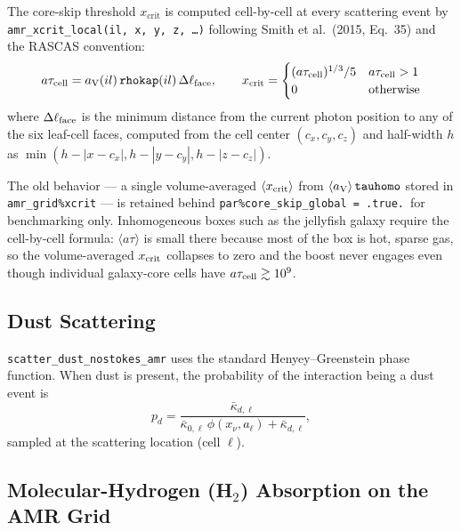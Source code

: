 \documentclass[english,a4paper]{my_memo}
\begin{document}
The core-skip threshold $x_\mathrm{crit}$ is computed cell-by-cell at every
scattering event by \texttt{amr\_xcrit\_local(il, x, y, z, \dots)}
following Smith et al.\ (2015, Eq.~35) and the RASCAS convention:
\[
   a\tau_{\rm cell} = a_{\rm V}(il)\,\mathtt{rhokap}(il)\,
                      \Delta\ell_{\rm face},
   \qquad
   x_{\rm crit} =
   \begin{cases}
     (a\tau_{\rm cell})^{1/3}/5 & a\tau_{\rm cell} > 1 \\
     0 & \text{otherwise}
   \end{cases}
\]
where $\Delta\ell_{\rm face}$ is the minimum distance from the current
photon position to any of the six leaf-cell faces, computed from the cell
center $(c_x, c_y, c_z)$ and half-width $h$ as $\min(h-|x-c_x|, h-|y-c_y|,
h-|z-c_z|)$.

The old behavior --- a single volume-averaged
$\langle x_{\rm crit}\rangle$ from
$\langle a_{\rm V}\rangle\,\mathtt{tauhomo}$ stored in
\texttt{amr\_grid\%xcrit} --- is retained behind
\texttt{par\%core\_skip\_global = .true.}\ for benchmarking only.
Inhomogeneous boxes such as the jellyfish galaxy require the cell-by-cell
formula: $\langle a\tau\rangle$ is small there because most of the box
is hot, sparse gas, so the volume-averaged $x_{\rm crit}$ collapses to
zero and the boost never engages even though individual galaxy-core
cells have $a\tau_{\rm cell}\gtrsim 10^9$.

\subsection{Dust Scattering}

\texttt{scatter\_dust\_nostokes\_amr} uses the standard
Henyey--Greenstein phase function.  When dust is present, the probability of
the interaction being a dust event is
\begin{equation}
  p_d = \frac{\bar\kappa_{d,\ell}}
             {\bar\kappa_{0,\ell}\,\phi(x_\nu, a_\ell) + \bar\kappa_{d,\ell}},
\end{equation}
sampled at the scattering location (cell $\ell$).

\subsection{Molecular-Hydrogen (H\texorpdfstring{$_2$}{2}) Absorption on the AMR Grid}
\end{document}
